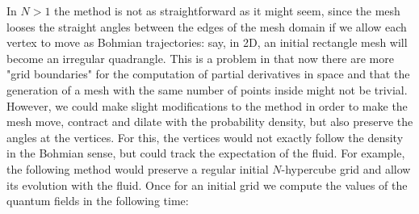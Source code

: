 \documentclass[11pt, a4paper]{article} %
\begin{document}
In $N>1$ the method is not as straightforward as it might seem, since the mesh looses the straight angles between the edges of the mesh domain if we allow each vertex to move as Bohmian trajectories: say, in 2D, an initial rectangle mesh will become an irregular quadrangle. This is a problem in that now there are more "grid boundaries" for the computation of partial derivatives in space and that the generation of a mesh with the same number of points inside might not be trivial. However, we could make slight modifications to the method in order to make the mesh move, contract and dilate with the probability density, but also preserve the angles at the vertices. For this, the vertices would not exactly follow the density in the Bohmian sense, but could track the expectation of the fluid. For example, the following method would preserve a regular initial $N$-hypercube grid and allow its evolution with the fluid. Once for an initial grid we compute the values of the quantum fields in the following time:\vspace{-0.2cm}
\end{document}
